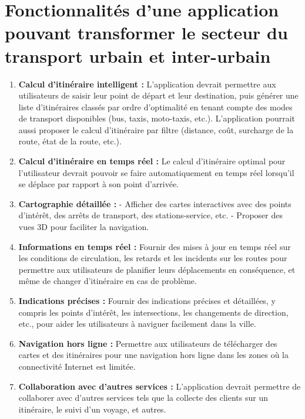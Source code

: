 \section{Fonctionnalités d'une application pouvant transformer le secteur du transport urbain et inter-urbain}

\begin{enumerate}
\item \textbf{Calcul d'itinéraire intelligent :}
L’application devrait permettre aux utilisateurs de saisir leur point de départ et leur destination, puis générer une liste d'itinéraires classés par ordre d'optimalité en tenant compte des modes de transport disponibles (bus, taxis, moto-taxis, etc.). L'application pourrait aussi proposer le calcul d'itinéraire par filtre (distance, coût, surcharge de la route, état de la route, etc.).
\item \textbf{Calcul d'itinéraire en temps réel :}
Le calcul d'itinéraire optimal pour l'utilisateur devrait pouvoir se faire automatiquement en temps réel lorsqu'il se déplace par rapport à son point d'arrivée.

\item \textbf{Cartographie détaillée :}
- Afficher des cartes interactives avec des points d’intérêt, des arrêts de transport, des stations-service, etc.
- Proposer des vues 3D pour faciliter la navigation.

\item \textbf{Informations en temps réel :}
Fournir des mises à jour en temps réel sur les conditions de circulation, les retards et les incidents sur les routes pour permettre aux utilisateurs de planifier leurs déplacements en conséquence, et même de changer d'itinéraire en cas de problème.

\item \textbf{Indications précises :}
Fournir des indications précises et détaillées, y compris les points d'intérêt, les intersections, les changements de direction, etc., pour aider les utilisateurs à naviguer facilement dans la ville.

\item \textbf{Navigation hors ligne :}
Permettre aux utilisateurs de télécharger des cartes et des itinéraires pour une navigation hors ligne dans les zones où la connectivité Internet est limitée.

\item \textbf{Collaboration avec d'autres services :}
L'application devrait permettre de collaborer avec d'autres services tels que la collecte des clients sur un itinéraire, le suivi d'un voyage, et autres.


\end{enumerate}
